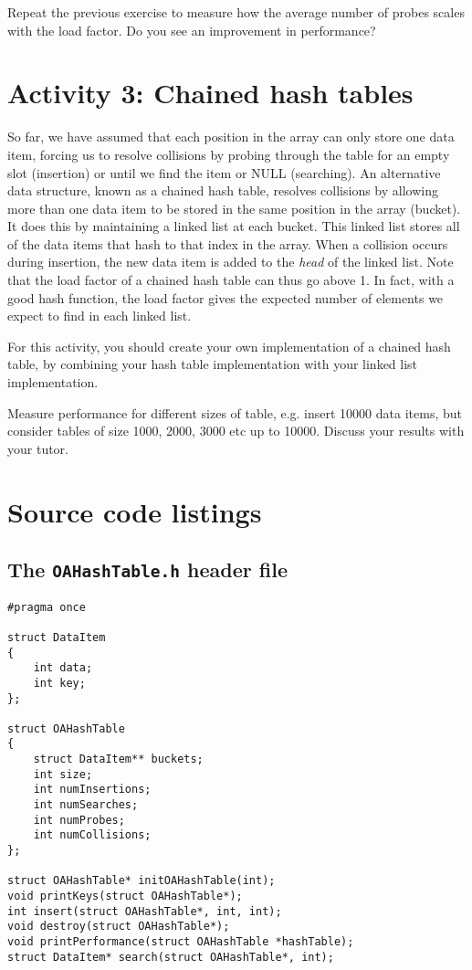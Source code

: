 \documentclass[10pt, a4paper, twosize]{article}
\begin{document}
Repeat the previous exercise to measure how the average number of probes scales with the load factor. Do you see an improvement in performance?

\section{Activity 3: Chained hash tables} 
So far, we have assumed that each position in the array can only store one data item, forcing us to resolve collisions by probing through the table for an empty slot (insertion) or until we find the item or NULL (searching). An alternative data structure, known as a chained hash table, resolves collisions by allowing more than one data item to be stored in the same position in the array (bucket). It does this by maintaining a linked list at each bucket. This linked list stores all of the data items that hash to that index in the array. When a collision occurs during insertion, the new data item is added to the \emph{head} of the linked list. Note that the load factor of a chained hash table can thus go above 1. In fact, with a good hash function, the load factor gives the expected number of elements we expect to find in each linked list.

For this activity, you should create your own implementation of a chained hash table, by combining your hash table implementation with your linked list implementation.  

Measure performance for different sizes of table, e.g. insert 10000 data items, but consider tables of size 1000, 2000, 3000 etc up to 10000. Discuss your results with your tutor.


\section{Source code listings}
\subsection{The \texttt{OAHashTable.h} header file}
\begin{lstlisting}
#pragma once

struct DataItem 
{
	int data;
	int key;
};

struct OAHashTable
{
	struct DataItem** buckets;
	int size;
	int numInsertions;
	int numSearches;
	int numProbes;
	int numCollisions;
};

struct OAHashTable* initOAHashTable(int);
void printKeys(struct OAHashTable*);
int insert(struct OAHashTable*, int, int);
void destroy(struct OAHashTable*);
void printPerformance(struct OAHashTable *hashTable);
struct DataItem* search(struct OAHashTable*, int);
\end{lstlisting}
\end{document}
